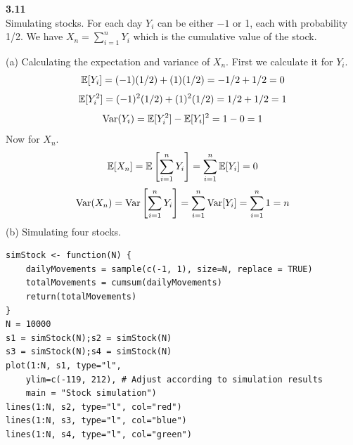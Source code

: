 \newpage\noindent
\textbf{3.11}\\  %
Simulating stocks. For each day $Y_i$ can be either $-1$ or 1, each with probability 1/2.
We have $X_n = \sum_{i=1}^n Y_i$ which is the cumulative value of the stock.

\medskip\noindent(a) Calculating the expectation and variance of $X_n$. First we calculate it for
$Y_i$.
$$
\mathbb{E}[Y_i] = (-1)(1/2) + (1)(1/2) = -1/2 + 1/2 = 0
$$
$$
\mathbb{E}[Y_i^2] = (-1)^2(1/2) + (1)^2(1/2) = 1/2 + 1/2 = 1
$$
$$
\text{Var}(Y_i) = \mathbb{E}[Y_i^2] - \mathbb{E}[Y_i]^2 = 1 - 0 = 1
$$
Now for $X_n$.
$$
\mathbb{E}[X_n] = \mathbb{E}\left[\sum_{i=1}^n Y_i\right] = \sum_{i=1}^n \mathbb{E}[Y_i] = 0
$$
$$
\text{Var}(X_n) = \text{Var}\left[\sum_{i=1}^n Y_i\right] = \sum_{i=1}^n \text{Var}[Y_i] = \sum_{i=1}^n 1 = n
$$
(b) Simulating four stocks.
\begin{lstlisting}[style=RSyntax, title=R]
simStock <- function(N) {
    dailyMovements = sample(c(-1, 1), size=N, replace = TRUE)
    totalMovements = cumsum(dailyMovements)
    return(totalMovements)
} 
N = 10000
s1 = simStock(N);s2 = simStock(N)
s3 = simStock(N);s4 = simStock(N)
plot(1:N, s1, type="l",
    ylim=c(-119, 212), # Adjust according to simulation results
    main = "Stock simulation")
lines(1:N, s2, type="l", col="red")
lines(1:N, s3, type="l", col="blue")
lines(1:N, s4, type="l", col="green")
\end{lstlisting}
